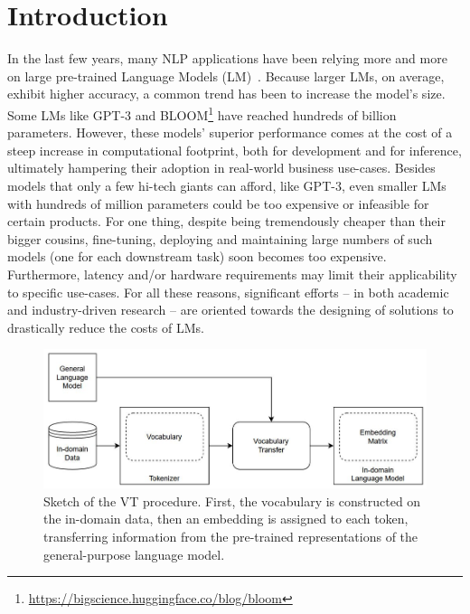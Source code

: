 \documentclass[11pt]{article}
\begin{document}
\section{Introduction}
In the last few years, many NLP applications have been relying more and more on large pre-trained Language Models (LM)~\cite{bert,roberta,he2020deberta}. Because larger LMs, on average, exhibit higher accuracy, a common trend has been to increase the model's size. %
Some LMs like GPT-3 \cite{brown2020language} and BLOOM\footnote{\url{https://bigscience.huggingface.co/blog/bloom}} have reached hundreds of billion parameters. 
%
However, these models' superior performance comes at the cost of a steep increase in computational footprint, both for development and for inference, %
ultimately hampering their adoption in real-world business use-cases.
%
Besides models that only a few hi-tech giants can afford, like GPT-3, %
even smaller LMs with hundreds of million parameters could be too expensive or infeasible for certain products. 
For one thing, despite being tremendously cheaper than their bigger cousins, fine-tuning, deploying and maintaining large numbers of such models (one for each downstream task) soon becomes too expensive. Furthermore, latency and/or hardware requirements may limit their applicability to specific use-cases. 
For all these reasons, significant efforts -- in both academic and industry-driven research -- are oriented towards the designing of solutions to drastically reduce the costs of LMs.

\begin{figure}[ht]
  \centering
  \includegraphics[scale=0.75]{images/vocabulary_transfer.JPG}
  \caption{Sketch of the VT procedure. First, the vocabulary is constructed on the in-domain data, then an embedding is assigned to each token, transferring information from the pre-trained representations of the general-purpose language model.}
\end{figure}
\end{document}
